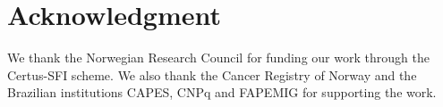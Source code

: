 \documentclass[10pt, conference]{IEEEtran}
\begin{document}
\section*{Acknowledgment}
We thank the Norwegian Research Council for funding our work through the Certus-SFI scheme. We also thank the Cancer Registry of Norway and the Brazilian institutions CAPES, CNPq and FAPEMIG for supporting the work.
\vspace{7mm}

\balance

 
\end{document}
